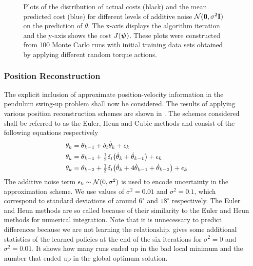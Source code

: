 \begin{figure}
{
\label{fig:cub1}
}
\caption{Plots of the distribution of actual costs (black) and the mean predicted cost (blue) for different levels of additive noise $\mathcal{N}(\mathbf{0},\sigma^2\mathbf{I})$ on the prediction of $\theta$. The x-axis displays the algorithm iteration and the y-axis shows the cost $J(\boldsymbol{\psi})$. These plots were constructed from 100 Monte Carlo runs with initial training data sets obtained by applying different random torque actions.}
\label{fig:integ}
\end{figure}








\subsubsection{Position Reconstruction}
The explicit inclusion of approximate position-velocity information in the pendulum swing-up problem shall now be considered. The results of applying various position reconstruction schemes are shown in . The schemes considered shall be referred to as the Euler, Heun and Cubic methods and consist of the following equations respectively
\begin{align}
\theta_k &= \theta_{k-1} + \delta_t\dot\theta_k + \epsilon_k
\label{eqn:pen_eul} \\
\theta_k &= \theta_{k-1} + \tfrac{1}{2}\delta_t\big(\dot\theta_k + \dot\theta_{k-1} \big) + \epsilon_k
\label{eqn:pen_heu} \\
\theta_k &= \theta_{k-2} + \tfrac{1}{3}\delta_t \big( \dot\theta_{k} + 4\dot\theta_{k-1} + \dot\theta_{k-2} \big) + \epsilon_k
\label{eqn:pen_cub} 
\end{align}
The additive noise term $\epsilon_k \sim \mathcal{N}(0,\sigma^2)$ is used to encode uncertainty in the approximation scheme. We use values of $\sigma^2=0.01$ and $\sigma^2=0.1$, which correspond to standard deviations of around $6^\circ$ and $18^\circ$ respectively. The Euler and Heun methods are so called because of their similarity to the Euler and Heun methods for numerical integration. Note that it is unnecessary to predict differences because we are not learning the relationship. 
%
 gives some additional statistics of the learned policies at the end of the six iterations for $\sigma^2=0$ and $\sigma^2=0.01$. It shows how many runs ended up in the bad local minimum and the number that ended up in the global optimum solution.


